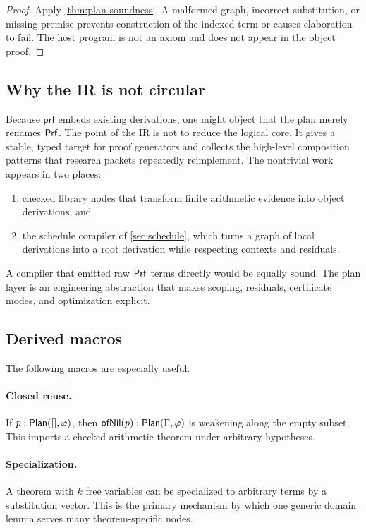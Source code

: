 \begin{proof}
Apply \cref{thm:plan-soundness}.  A malformed graph, incorrect substitution, or missing premise
prevents construction of the indexed term or causes elaboration to fail.  The host program is not an
axiom and does not appear in the object proof.
\end{proof}

\subsection{Why the IR is not circular}

Because \(\mathsf{prf}\) embeds existing derivations, one might object that the plan merely renames
\(\mathsf{Prf}\).  The point of the IR is not to reduce the logical core.  It gives a stable, typed target for
proof generators and collects the high-level composition patterns that research packets repeatedly
reimplement.  The nontrivial work appears in two places:

\begin{enumerate}
\item checked library nodes that transform finite arithmetic evidence into object derivations; and
\item the schedule compiler of \cref{sec:schedule}, which turns a graph of local derivations into a
      root derivation while respecting contexts and residuals.
\end{enumerate}

A compiler that emitted raw \(\mathsf{Prf}\) terms directly would be equally sound.  The plan layer is an
engineering abstraction that makes scoping, residuals, certificate modes, and optimization explicit.

\subsection{Derived macros}

The following macros are especially useful.

\paragraph{Closed reuse.}
If \(p:\mathsf{Plan}([],\varphi)\), then \(\mathsf{ofNil}(p):\mathsf{Plan}(\Gamma,\varphi)\) is weakening along the
empty subset.  This imports a checked arithmetic theorem under arbitrary hypotheses.

\paragraph{Specialization.}
A theorem with \(k\) free variables can be specialized to arbitrary terms by a substitution vector.
This is the primary mechanism by which one generic domain lemma serves many theorem-specific nodes.

